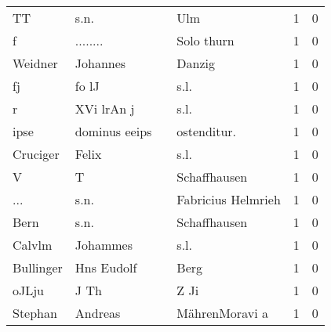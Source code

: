 \documentclass[10pt,a4paper,landscape]{article}
\begin{document}
\begin{longtable}{llllrr}
                       TT &                               s.n. &             &                                         Ulm &          1 &         0 \\
                        f &                           ........ &             &                                  Solo thurn &          1 &         0 \\
                  Weidner &                           Johannes &             &                                      Danzig &          1 &         0 \\
                       fj &                              fo lJ &             &                                        s.l. &          1 &         0 \\
                        r &                         XVi lrAn j &             &                                        s.l. &          1 &         0 \\
                     ipse &                      dominus eeips &             &                                ostenditur.  &          1 &         0 \\
                 Cruciger &                              Felix &             &                                        s.l. &          1 &         0 \\
                        V &                                  T &             &                                Schaffhausen &          1 &         0 \\
                      ... &                               s.n. &             &                          Fabricius Helmrieh &          1 &         0 \\
                     Bern &                               s.n. &             &                                Schaffhausen &          1 &         0 \\
                   Calvlm &                           Johammes &             &                                        s.l. &          1 &         0 \\
                Bullinger &                         Hns Eudolf &             &                                        Berg &          1 &         0 \\
                    oJLju &                               J Th &             &                                        Z Ji &          1 &         0 \\
                  Stephan &                            Andreas &             &                              MährenMoravi a &          1 &         0 \\

\end{longtable}
\end{document}
